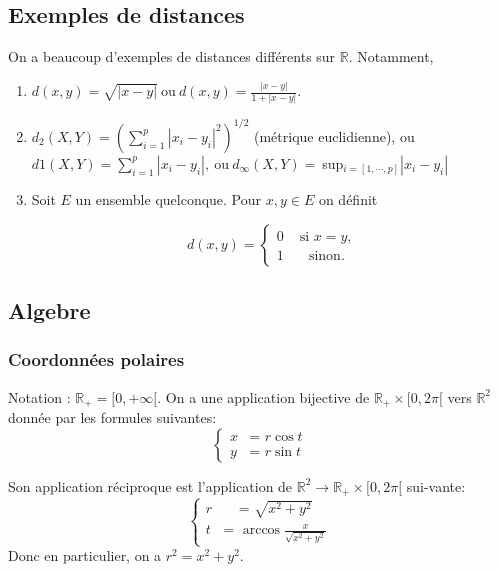 \documentclass[a4paper, 12pt]{article}
\begin{document}
    \subsection{Exemples de distances}

    On a beaucoup d'exemples de distances diff\'erents sur $\mathbb{R}$. Notamment,
    \begin{enumerate}
        \item $d(x,y) = \displaystyle{\sqrt{|x - y |}} ~$ou$~ d(x,y) = \displaystyle{\frac{|x-y|}{1+|x-y|}.}$
        \item $d_2(X,Y)=\left(\sum_{i=1}^p|x_i-y_i|^2\right)^{1/2}$ (m\'etrique euclidienne), ou $d1(X,Y)=\sum_{i=1}^p|x_i-y_i|,~$ou$~ d_\infty(X,Y)=~$sup$_{i=[1,\cdots,p]}|x_i-y_i|$
        \item Soit $E$ un ensemble quelconque. Pour $x,y \in E$ on d\'efinit 
        
        
        \begin{displaymath}
            d(x,y)= \left\{ \begin{array}{ll}
                0 & \textrm{~si $x=y$,}\\
                1 & \textrm{~~~sinon.}       
            \end{array} \right.
        \end{displaymath}
    \end{enumerate}
        
        \subsection{Algebre}
        \subsubsection{Coordonn\'ees polaires}
        
        Notation : $\mathbb{R_+} =[0,+\infty[$. On a une application bijective de $\mathbb{R_+}\times [0,2\pi[$ vers $\mathbb{R}^2$ donn\'ee par les formules suivantes:
        \begin{equation}
            \left\{ \begin{array}{cc}
            x & \textrm{= $r\cos t$}\\
            y & \textrm{= $r\sin t$}       
            \end{array} \right.
            \end{equation}

        \newpage

        Son application r\'eciproque est l'application de $\mathbb{R}^2 \rightarrow \mathbb{R}_+ \times [0,2\pi[$ sui-vante:
        \begin{equation}
            \left\{ \begin{array}{ll}
            r & ~~~~~\textrm{= $\displaystyle{\sqrt{x^2+y^2}}$}\\
            t & \textrm{= $\arccos \displaystyle{\frac{x}{\sqrt{x^2+y^2}}}$}      
            \end{array} \right.
            \end{equation}
            Donc en particulier, on a $r^2=x^2+y^2$.
        
\end{document}
